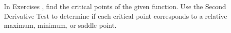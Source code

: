 {\noindent In Exercises}
{, find the critical points of the given function. Use the Second Derivative Test to determine if each critical point corresponds to a relative maximum, minimum, or saddle point.
}
